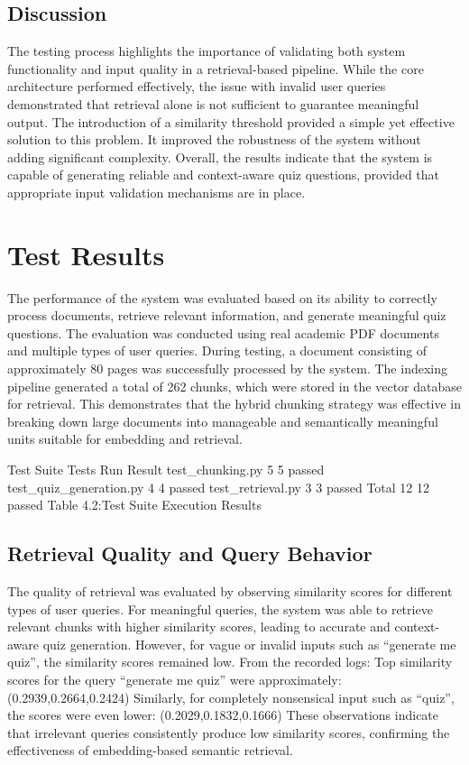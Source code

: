 \documentclass[12pt,a4paper]{report}
\begin{document}
\subsection{Discussion}
The testing process highlights the importance of validating both system functionality and input quality in a retrieval-based pipeline. While the core architecture performed effectively, the issue with invalid user queries demonstrated that retrieval alone is not sufficient to guarantee meaningful output.
The introduction of a similarity threshold provided a simple yet effective solution to this problem. It improved the robustness of the system without adding significant complexity.
Overall, the results indicate that the system is capable of generating reliable and context-aware quiz questions, provided that appropriate input validation mechanisms are in place.


\section{Test Results}
The performance of the system was evaluated based on its ability to correctly process documents, retrieve relevant information, and generate meaningful quiz questions. The evaluation was conducted using real academic PDF documents and multiple types of user queries.
During testing, a document consisting of approximately 80 pages was successfully processed by the system. The indexing pipeline generated a total of 262 chunks, which were stored in the vector database for retrieval.
This demonstrates that the hybrid chunking strategy was effective in breaking down large documents into manageable and semantically meaningful units suitable for embedding and retrieval.




Test Suite
Tests Run
Result
test\_chunking.py
5
5 passed
test\_quiz\_generation.py
4
4 passed
test\_retrieval.py
3
3 passed
Total
12
12 passed
Table 4.2:Test Suite Execution Results
\subsection{Retrieval Quality and Query Behavior}
The quality of retrieval was evaluated by observing similarity scores for different types of user queries.
For meaningful queries, the system was able to retrieve relevant chunks with higher similarity scores, leading to accurate and context-aware quiz generation. However, for vague or invalid inputs such as “generate me quiz”, the similarity scores remained low.
From the recorded logs:
Top similarity scores for the query “generate me quiz” were approximately:
(0.2939,0.2664,0.2424)
Similarly, for completely nonsensical input such as “quiz”, the scores were even lower:
(0.2029,0.1832,0.1666)
These observations indicate that irrelevant queries consistently produce low similarity scores, confirming the effectiveness of embedding-based semantic retrieval.
\end{document}
